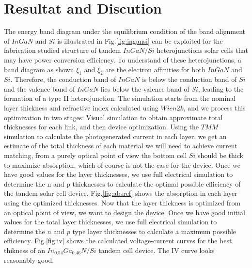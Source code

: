 \documentclass[preprint,12pt]{elsarticle}
\begin{document}
\section{Resultat and Discution} \label{sec:R_D}
The energy band diagram under the equilibrium condition of the band alignment of $InGaN$ and $Si$ is illustrated in Fig.\ref{fig:ingansi} can be exploited for the fabrication studied structure of tandem $InGaN/Si$ heterojunctions solar cells that may have power conversion efficiency. To understand of these heterojunctions, a band diagram as shown $ \xi_{1}$ and $ \xi_{2}$ are the electron affinities for both $InGaN$ and $Si$. Therefore, the conduction band of $InGaN$ is below the conduction band of $Si$ and the valence band of $InGaN$ lies below the valence band of $Si$, leading to the formation of a type II heterojunction. The simulation starts from the nominal layer thickness and refractive index calculated using $Wien2k$, and we process this optimization in two stages: Visual simulation to obtain approximate total thicknesses for each link, and then device optimization. Using the $TMM$ simulation to calculate the photogenerated current in each layer, we get an estimate of the total thickness of each material we will need to achieve current matching, from a purely optical point of view the bottom cell $Si$ should be thick to maximize absorption, which of course is not the case for the device. Once we have good values for the layer thicknesses, we use full electrical simulation to determine the n and p thicknesses to calculate the optimal possible efficiency of the tandem solar cell device. Fig.\ref{fig:absref} shows the absorption in each layer using the optimized thicknesses. Now that the layer thickness is optimized from an optical point of view, we want to design the device. Once we have good initial values for the total layer thicknesses, we use full electrical simulation to determine the $n$ and $p$ type layer thicknesses to calculate a maximum possible efficiency. Fig.\ref{fig:iv} shows the calculated voltage-current curves for the best thikness of an $In_{0.54}Ga_{0.46}N/Si$ tandem cell device. The IV curve looks reasonably good.
\end{document}
